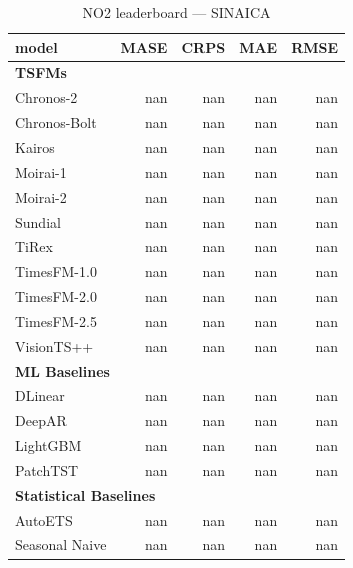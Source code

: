 \begin{table}[H]
\caption{NO2 leaderboard --- SINAICA}
\centering
\begin{small}
\begin{tabular}{lrrrr}
\toprule
model & MASE & CRPS & MAE & RMSE \\
\midrule
\multicolumn{5}{l}{\textbf{TSFMs}} \\
Chronos-2 & nan & nan & nan & nan \\
Chronos-Bolt & nan & nan & nan & nan \\
Kairos & nan & nan & nan & nan \\
Moirai-1 & nan & nan & nan & nan \\
Moirai-2 & nan & nan & nan & nan \\
Sundial & nan & nan & nan & nan \\
TiRex & nan & nan & nan & nan \\
TimesFM-1.0 & nan & nan & nan & nan \\
TimesFM-2.0 & nan & nan & nan & nan \\
TimesFM-2.5 & nan & nan & nan & nan \\
VisionTS++ & nan & nan & nan & nan \\
\midrule
\multicolumn{5}{l}{\textbf{ML Baselines}} \\
DLinear & nan & nan & nan & nan \\
DeepAR & nan & nan & nan & nan \\
LightGBM & nan & nan & nan & nan \\
PatchTST & nan & nan & nan & nan \\
\midrule
\multicolumn{5}{l}{\textbf{Statistical Baselines}} \\
AutoETS & nan & nan & nan & nan \\
Seasonal Naive & nan & nan & nan & nan \\
\bottomrule
\end{tabular}
\end{small}
\end{table}